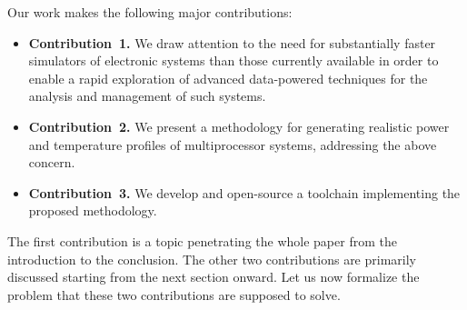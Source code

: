 Our work makes the following major contributions:

\begin{itemize}
  \item {\bfseries Contribution~1.} We draw attention to the need for
  substantially faster simulators of electronic systems than those currently
  available in order to enable a rapid exploration of advanced data-powered
  techniques for the analysis and management of such systems.

  \item {\bfseries Contribution~2.} We present a methodology for generating
  realistic power and temperature profiles of multiprocessor systems,
  addressing the above concern.

  \item {\bfseries Contribution~3.} We develop and open-source a toolchain
  implementing the proposed methodology.
\end{itemize}

The first contribution is a topic penetrating the whole paper from the
introduction to the conclusion. The other two contributions are primarily
discussed starting from the next section onward. Let us now formalize the
problem that these two contributions are supposed to solve.
